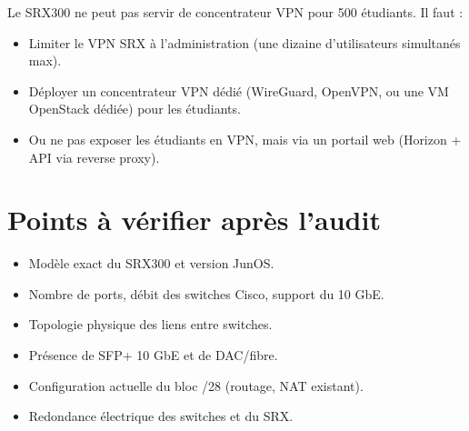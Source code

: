\begin{warnbox}
Le SRX300 ne peut pas servir de concentrateur VPN pour 500 étudiants. Il faut :
\begin{itemize}
  \item Limiter le VPN SRX à l'administration (une dizaine d'utilisateurs simultanés max).
  \item Déployer un concentrateur VPN dédié (WireGuard, OpenVPN, ou une VM OpenStack dédiée) pour les étudiants.
  \item Ou ne pas exposer les étudiants en VPN, mais via un portail web (Horizon + API via reverse proxy).
\end{itemize}
\end{warnbox}

\section{Points à vérifier après l'audit}
\begin{itemize}
  \item Modèle exact du SRX300 et version JunOS.
  \item Nombre de ports, débit des switches Cisco, support du 10 GbE.
  \item Topologie physique des liens entre switches.
  \item Présence de SFP+ 10 GbE et de DAC/fibre.
  \item Configuration actuelle du bloc /28 (routage, NAT existant).
  \item Redondance électrique des switches et du SRX.
\end{itemize}